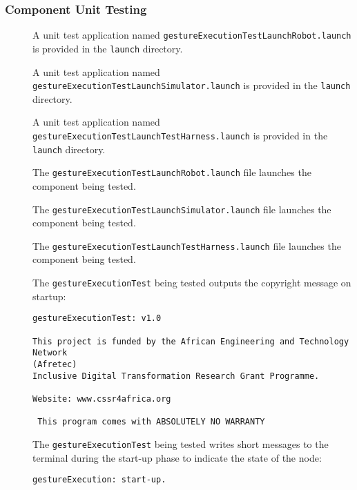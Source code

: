 \documentclass{CSSRforAfrica}
\newcommand{\checkboxChecked}{\fbox{\ding{51}}} %
\newcommand{\checkboxDashed}{\fbox{--}}         %
\begin{document}
\subsubsection{Component Unit Testing}
\label{subsubsection:gesture_execution_test_unit_testing}


\begin{description}
\item[\checkboxChecked] A unit test application named {\small \verb+gestureExecutionTestLaunchRobot.launch+} is provided in the {\small \verb+launch+} directory. 

\item[\checkboxChecked] A unit test application named {\small \verb+gestureExecutionTestLaunchSimulator.launch+} is provided in the {\small \verb+launch+} directory. 

\item[\checkboxChecked] A unit test application named {\small \verb+gestureExecutionTestLaunchTestHarness.launch+} is provided in the {\small \verb+launch+} directory. 

\item[\checkboxChecked] The {\small \verb+gestureExecutionTestLaunchRobot.launch+} file  launches the component being tested.

\item[\checkboxDashed] The {\small \verb+gestureExecutionTestLaunchSimulator.launch+} file  launches the component being tested.

\item[\checkboxChecked] The {\small \verb+gestureExecutionTestLaunchTestHarness.launch+} file  launches the component being tested.

\item[\checkboxChecked]  The {\small \verb+gestureExecutionTest+} being tested outputs the copyright message on startup:
\begin{verbatim}
gestureExecutionTest: v1.0
 
This project is funded by the African Engineering and Technology Network 
(Afretec) 
Inclusive Digital Transformation Research Grant Programme.
 
Website: www.cssr4africa.org
 
 This program comes with ABSOLUTELY NO WARRANTY
\end{verbatim}

\newpage
\item[\checkboxChecked]  The {\small \verb+gestureExecutionTest+} being tested writes short messages to the terminal during the start-up phase to
 indicate the state of the node:
\begin{verbatim}
gestureExecution: start-up.
\end{verbatim}


\end{description}
\end{document}
